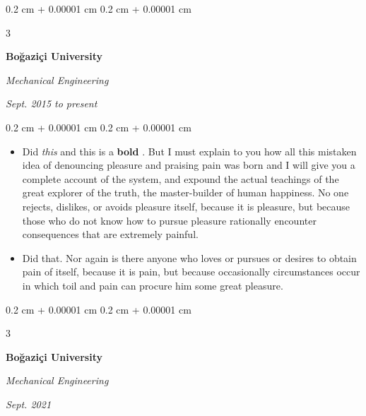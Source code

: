 \documentclass[10pt, letterpaper]{article}
\newenvironment{highlights}{
    \begin{itemize}[
        topsep=0.10 cm,
        parsep=0.10 cm,
        partopsep=0pt,
        itemsep=0pt,
        leftmargin=0.4 cm + 10pt + 0.6 cm
    ]
}{
    \end{itemize}
} %
\newenvironment{onecolentry}{
    \begin{adjustwidth}{
        0.2 cm + 0.00001 cm
    }{
        0.2 cm + 0.00001 cm
    }
}{
    \end{adjustwidth}
} %
\newenvironment{threecolentry}[3][]{
    \onecolentry
    \def\thirdColumn{#3}
    \setcolumnwidth{0.6 cm, \fill, 4.5 cm}
    \begin{paracol}{3}
    #2 \switchcolumn
}{
    \switchcolumn \raggedleft \thirdColumn
    \end{paracol}
    \endonecolentry
} %
\let\hrefWithoutArrow\href
\renewcommand{\href}[2]{\hrefWithoutArrow{#1}{\mbox{\ifthenelse{\equal{#2}{}}{ }{#2 }\raisebox{.15ex}{\footnotesize \faExternalLink*}}}}
\begin{document}
        \vspace{0.2 cm-3px}

        \begin{threecolentry}{
            \vspace*{\fill}
            \textbullet
            \vspace*{3px}
            \vspace*{\fill}
        }{
            
            
        \textit{Sept. 2015 to present}}
            \textbf{Boğaziçi University}

            \textit{Mechanical Engineering}
        \end{threecolentry}

        \vspace{0.10 cm-3px}
        \begin{onecolentry}
            \begin{highlights}
                \item Did \textit{this} and this is a \textbf{bold} \href{https://example.com}{link}. But I must explain to you how all this mistaken idea of denouncing pleasure and praising pain was born and I will give you a complete account of the system, and expound the actual teachings of the great explorer of the truth, the master-builder of human happiness. No one rejects, dislikes, or avoids pleasure itself, because it is pleasure, but because those who do not know how to pursue pleasure rationally encounter consequences that are extremely painful.
                \item Did that. Nor again is there anyone who loves or pursues or desires to obtain pain of itself, because it is pain, but because occasionally circumstances occur in which toil and pain can procure him some great pleasure.
            \end{highlights}
        \end{onecolentry}


        \vspace{0.2 cm-3px}

        \begin{threecolentry}{
            \vspace*{\fill}
            \textbullet
            \vspace*{3px}
            \vspace*{\fill}
        }{
            
            
        \textit{Sept. 2021}}
            \textbf{Boğaziçi University}

            \textit{Mechanical Engineering}
        \end{threecolentry}
\end{document}
